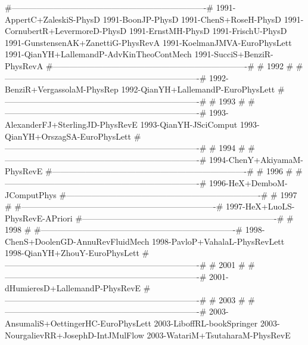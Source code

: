 #----------------------------------------------------------------------#
1991-AppertC+ZaleskiS-PhysD
1991-BoonJP-PhysD
1991-ChenS+RoseH-PhysD
1991-CornubertR+LevermoreD-PhysD
1991-ErnstMH-PhysD
1991-FrischU-PhysD
1991-GunstensenAK+ZanettiG-PhysRevA
1991-KoelmanJMVA-EuroPhysLett
1991-QianYH+LallemandP-AdvKinTheoContMech
1991-SucciS+BenziR-PhysRevA
#----------------------------------------------------------------------#
#                                 1992                                 #
#----------------------------------------------------------------------#
1992-BenziR+VergassolaM-PhysRep
1992-QianYH+LallemandP-EuroPhysLett
#----------------------------------------------------------------------#
#                                 1993                                 #
#----------------------------------------------------------------------#
1993-AlexanderFJ+SterlingJD-PhysRevE
1993-QianYH-JSciComput
1993-QianYH+OrszagSA-EuroPhysLett
#----------------------------------------------------------------------#
#                                 1994                                 #
#----------------------------------------------------------------------#
1994-ChenY+AkiyamaM-PhysRevE
#----------------------------------------------------------------------#
#                                 1996                                 #
#----------------------------------------------------------------------#
1996-HeX+DemboM-JComputPhys
#----------------------------------------------------------------------#
#                                 1997                                 #
#----------------------------------------------------------------------#
1997-HeX+LuoLS-PhysRevE-APriori
#----------------------------------------------------------------------#
#                                 1998                                 #
#----------------------------------------------------------------------#
1998-ChenS+DoolenGD-AnnuRevFluidMech
1998-PavloP+VahalaL-PhysRevLett
1998-QianYH+ZhouY-EuroPhysLett
#----------------------------------------------------------------------#
#                                 2001                                 #
#----------------------------------------------------------------------#
2001-dHumieresD+LallemandP-PhysRevE
#----------------------------------------------------------------------#
#                                 2003                                 #
#----------------------------------------------------------------------#
2003-AnsumaliS+OettingerHC-EuroPhysLett
2003-LiboffRL-bookSpringer
2003-NourgalievRR+JosephD-IntJMulFlow
2003-WatariM+TsutaharaM-PhysRevE
